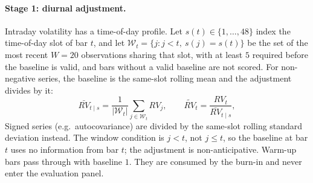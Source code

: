 \paragraph{Stage 1: diurnal adjustment.}
Intraday volatility has a time-of-day profile. Let
$s(t) \in \{1,\dots,48\}$ index the time-of-day slot of bar $t$, and let
$\mathcal{W}_t = \{j : j < t,\ s(j)=s(t)\}$ be the set of the most recent
$W = 20$ observations sharing that slot, with at least $5$ required before
the baseline is valid, and bars without a valid baseline are not scored. For
non-negative series, the baseline is the
same-slot rolling mean and the adjustment divides by it:
\begin{equation}
    \bar{RV}_{t\mid s} = \frac{1}{|\mathcal{W}_t|}\sum_{j \in \mathcal{W}_t} RV_j,
    \qquad
    \widetilde{RV}_t = \frac{RV_t}{\bar{RV}_{t\mid s}},
    \label{eq:dp_diurnal}
\end{equation}
Signed series (e.g.\ autocovariance) are divided by the same-slot rolling
standard deviation instead. The window condition is $j < t$, not
$j \le t$, so the baseline at bar $t$ uses no information from bar $t$;
the adjustment is non-anticipative. Warm-up bars pass through with
baseline $1$. They are consumed by the burn-in and never enter the
evaluation panel.

